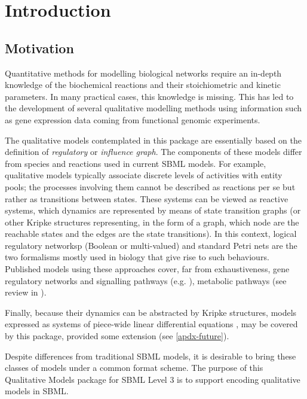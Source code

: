 
\section{Introduction}
\label{intro}

\subsection{Motivation}

Quantitative methods for modelling biological networks require an
in-depth knowledge of the biochemical reactions and their stoichiometric
and kinetic parameters. In many practical cases, this knowledge is
missing. This has led to the development of several qualitative
modelling methods using information such as gene expression data coming
from functional genomic experiments.

The qualitative models contemplated in this package are essentially
based on the definition of \emph{regulatory} or \emph{influence
  graph}. The components of these models differ from species and
reactions used in current SBML models. For example, qualitative models
typically associate discrete levels of activities with entity pools; the
processes involving them cannot be described as reactions per se but
rather as transitions between states. These systems can be viewed as
reactive systems, which dynamics are represented by means of state
transition graphs (or other Kripke structures representing, in the form
of a graph, which node are the reachable states and the edges are the
state transitions). In this context, logical regulatory networksp
(Boolean or multi-valued) \cite{kauffman69,thomas91} and standard Petri
nets \cite{chaouiya07} are the two formalisms mostly used in biology
that give rise to such behaviours. Published models using these approaches cover, far from exhaustiveness, gene regulatory networks and signalling pathways (e.g. \cite{thieffry95,sanchez03,albert03,faure06,mendoza06,helikar08,naldi10,calzone10}), metabolic pathways (see review in \cite{chaouiya07}). 

Finally, because their dynamics can be abstracted by Kripke
structures, models expressed as systems of piece-wide linear
differential equations \cite{batt05}, may be covered by this package, provided some extension (see \ref{apdx-future}).


 Despite differences from traditional SBML models, it is desirable to
 bring these classes of models under a common format scheme. The purpose
 of this Qualitative Models package for SBML Level 3 is to support
 encoding qualitative models in SBML.

